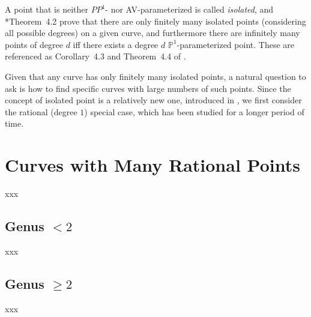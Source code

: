 \documentclass[12pt, reqno]{amsart}
\newcommand{\PP}{{\mathbb P}}
\numberwithin{equation}{section}
\numberwithin{table}{section}
\begin{document}
A point that is neither $PP^1$- nor AV-parameterized is called
\textit{isolated}, and \cite{Bourdon2019}*{Theorem~4.2} prove that
there are only finitely many isolated points (considering all possible
degrees) on a given curve, and furthermore there are infinitely many
points of degree $d$ iff there exists a degree $d$
$\PP^1$-parameterized point.  These are referenced as Corollary~4.3
and Theorem~4.4 of \cite{Viray2024}.

Given that any curve has only finitely many isolated points, a natural
question to ask is how to find specific curves with large numbers of
such points. Since the concept of isolated point is a relatively new
one, introduced in \cite{Bourdon2019}, we first consider the rational
(degree $1$) special case, which has been studied for a longer period
of time.


\section{Curves with Many Rational Points}

xxx

\subsection{Genus \texorpdfstring{$< 2$}{< 2}}

xxx

\subsection{Genus \texorpdfstring{$\ge 2$}{> 2}}

xxx


\end{document}
